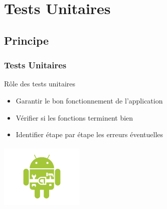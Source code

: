 \section{Tests Unitaires}
\subsection{Principe}
  \begin{frame}
\begin{minipage}{0.59\textwidth}
\frametitle{Tests Unitaires}
Rôle des tests unitaires
  \begin{itemize}
 \item Garantir le bon fonctionnement de l'application
    \item Vérifier si les fonctions terminent bien
    \item Identifier étape par étape les erreurs éventuelles
\end{itemize} 
\end{minipage}
\begin{minipage}{0.39\textwidth}
 \includegraphics[width=4cm, height=3.2cm]{Images/ImageSlide12.png}
\end{minipage}
\end{frame}